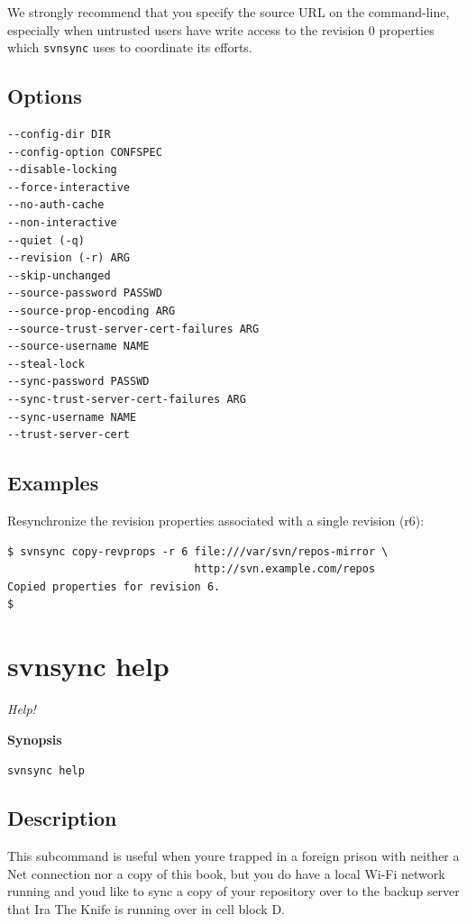 We strongly recommend that you specify the source URL on the
command-line, especially when untrusted users have write access to the
revision 0 properties which \texttt{svnsync} uses to coordinate its
efforts.

\subsection{Options}

\begin{verbatim}
--config-dir DIR
--config-option CONFSPEC
--disable-locking
--force-interactive
--no-auth-cache
--non-interactive
--quiet (-q)
--revision (-r) ARG
--skip-unchanged
--source-password PASSWD
--source-prop-encoding ARG
--source-trust-server-cert-failures ARG
--source-username NAME
--steal-lock
--sync-password PASSWD
--sync-trust-server-cert-failures ARG
--sync-username NAME
--trust-server-cert
\end{verbatim}

\subsection{Examples}

Resynchronize the revision properties associated with a single revision
(r6):

\begin{verbatim}
$ svnsync copy-revprops -r 6 file:///var/svn/repos-mirror \
                             http://svn.example.com/repos
Copied properties for revision 6.
$
\end{verbatim}

\section{svnsync help}\label{svn.ref.svnsync.c.help}

\emph{Help!}

\textbf{Synopsis}

\texttt{svnsync\ help}

\subsection{Description}

This subcommand is useful when you\textquotesingle re trapped in a
foreign prison with neither a Net connection nor a copy of this book,
but you do have a local Wi-Fi network running and you\textquotesingle d
like to sync a copy of your repository over to the backup server that
Ira The Knife is running over in cell block D.

